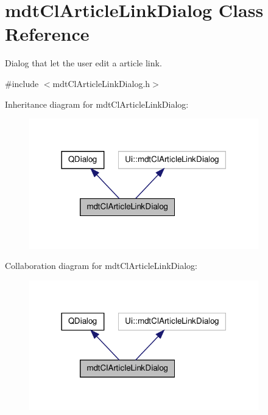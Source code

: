 \hypertarget{classmdt_cl_article_link_dialog}{\section{mdt\-Cl\-Article\-Link\-Dialog Class Reference}
\label{classmdt_cl_article_link_dialog}
}


Dialog that let the user edit a article link.  




{\ttfamily \#include $<$mdt\-Cl\-Article\-Link\-Dialog.\-h$>$}



Inheritance diagram for mdt\-Cl\-Article\-Link\-Dialog\-:\nopagebreak
\begin{figure}[H]
\begin{center}
\leavevmode
\includegraphics[width=282pt]{classmdt_cl_article_link_dialog__inherit__graph}
\end{center}
\end{figure}


Collaboration diagram for mdt\-Cl\-Article\-Link\-Dialog\-:\nopagebreak
\begin{figure}[H]
\begin{center}
\leavevmode
\includegraphics[width=282pt]{classmdt_cl_article_link_dialog__coll__graph}
\end{center}
\end{figure}
